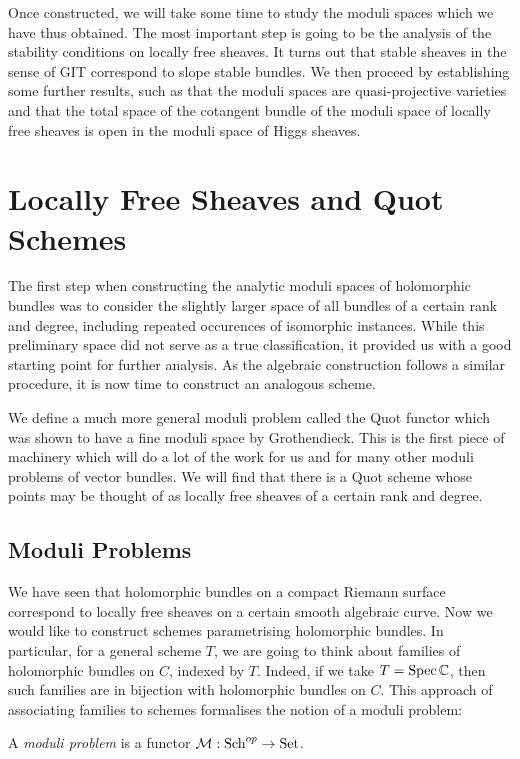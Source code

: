 \documentclass[12pt]{ociamthesis}  %
\begin{document}
Once constructed, we will take some time to study the moduli
spaces which we have thus obtained. The most important step is going
to be the analysis of the stability conditions on locally free
sheaves. It turns out that stable sheaves in the sense of GIT
correspond to slope stable bundles. We then proceed by establishing
some further results, such as that the moduli spaces are
quasi-projective varieties and that the total space of the cotangent
bundle of the moduli space of locally free sheaves is open in the
moduli space of Higgs sheaves.

\section{Locally Free Sheaves and Quot Schemes}

The first step when constructing the analytic moduli spaces of
holomorphic bundles was to consider the slightly larger space of
all bundles of a certain rank and degree, including repeated
occurences of isomorphic instances. While this preliminary space
did not serve as a true
classification,
it provided us with a good starting point for further analysis. As the
algebraic construction follows a similar procedure, it is now
time to construct an analogous scheme.

We define a much more general moduli problem called
the Quot functor which was shown to have a fine moduli space by
Grothendieck. This is the first piece of machinery which will do a
lot of the work for us and for many other moduli problems of vector
bundles. We will find that there is a Quot scheme whose points
may be thought of as locally free sheaves of a certain rank and
degree.

\subsection{Moduli Problems}

We have seen that holomorphic bundles on a compact Riemann surface
correspond to locally free sheaves on a certain smooth algebraic
curve. Now we would like to construct schemes parametrising holomorphic
bundles. In particular, for a general scheme $T$, we are going to
think about families of holomorphic bundles on $C$, indexed by
$T$. Indeed, if we take $T=\operatorname{Spec}\mathbb C$, then such families
are in bijection with holomorphic bundles on $C$. This approach
of associating families to schemes formalises the notion of a
moduli problem:

\begin{definition}
  A \emph{moduli problem} is a functor $\mathcal M:\operatorname{Sch}^{op}\to\operatorname{Set}$.
\end{definition}
\end{document}
